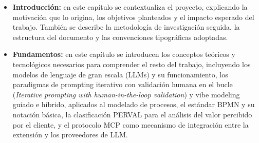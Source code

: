 \begin{itemize}
    \item[$\bullet$] \textbf{Introducción:} en este capítulo se contextualiza el proyecto, explicando la motivación que lo origina, los objetivos planteados y el impacto esperado del trabajo. También se describe la metodología de investigación seguida, la estructura del documento y las convenciones tipográficas adoptadas.

       \item[$\bullet$] \textbf{Fundamentos:} en este capítulo se introducen los conceptos teóricos y tecnológicos necesarios para comprender el resto del trabajo, incluyendo los modelos de lenguaje de gran escala (LLMs) y su funcionamiento, los paradigmas de prompting iterativo con validación humana en el bucle (\textit{Iterative prompting with human-in-the-loop validation}) y vibe modeling guiado e híbrido, aplicados al modelado de procesos, el estándar BPMN y su notación básica, la clasificación PERVAL para el análisis del valor percibido por el cliente, y el protocolo MCP como mecanismo de integración entre la extensión y los proveedores de LLM.



\end{itemize}
